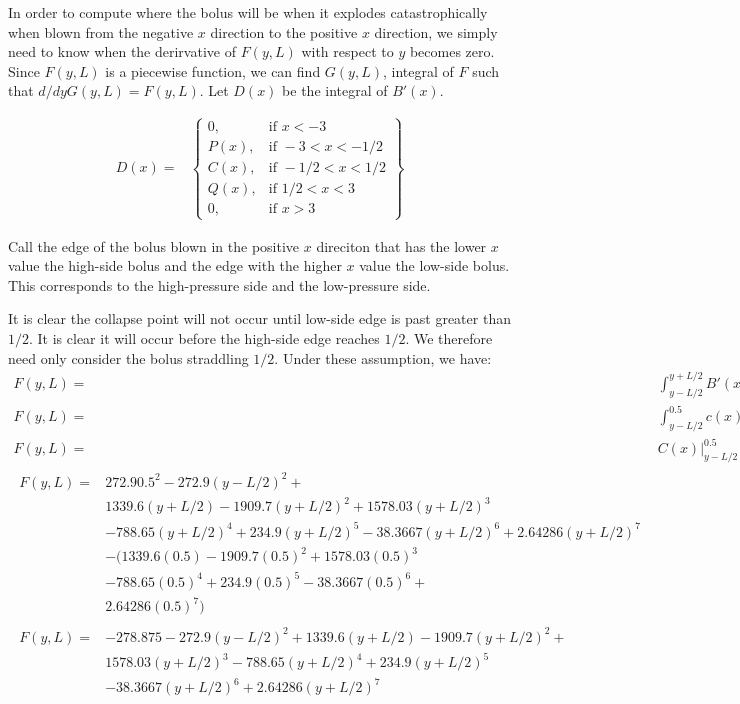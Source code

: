 \documentclass[]{asme2ej}
\begin{document}
In order to compute where the bolus will be when it explodes catastrophically when blown from
the negative $x$ direction to the positive $x$ direction, we simply need to know when the derirvative of
$F(y,L)$ with respect to $y$ becomes zero. Since $F(y,L)$ is a piecewise function, we can find $G(y,L)$,
integral of $F$ such that $d/dy G(y,L) = F(y,L)$. Let $D(x)$ be the integral of $B'(x)$.

\begin{align}
  D(x) =  &
\left\{
    \begin{array}{lr}
      0 , & \text{if } x < -3 \\
      P(x) , & \text{if } -3 < x  < -1/2 \\
      C(x) , & \text{if } -1/2 < x < 1/2 \\
      Q(x)   , & \text{if } 1/2 < x < 3 \\
      0 , & \text{if } x > 3
    \end{array}
    \right\}
    \label{eq:Dintegration}
\end{align}



Call the edge of the bolus blown in the positive $x$ direciton that has the lower $x$ value the high-side bolus and the edge with the higher $x$ value the low-side bolus.
This corresponds to the high-pressure side and the low-pressure side.

It is clear the collapse point will not occur until low-side edge is past greater than $1/2$. It is clear it will occur before the high-side edge reaches $1/2$. We therefore need only consider the bolus straddling
$1/2$.
Under these assumption, we have:
\begin{align}
  F(y,L) = & \int_{y-L/2}^{y+L/2} B'(x) dx \\
  F(y,L) = & \int_{y-L/2}^{0.5} c(x) dx  + \int_{0.5}^{y+L/2} q(x) dx   \\
  F(y,L) = & C(x) \bigg\rvert_{y-L/2}^{0.5}   +  Q(x) \bigg\rvert_{0.5}^{y+L/2} \\
  \begin{split}
  F(y,L) = & 272.9 0.5^2 - 272.9 (y-L/2)^2 + \\
  & 1339.6 (y+L/2) - 1909.7 (y+L/2)^2 + 1578.03 (y+L/2)^3 \\
  & - 788.65 (y+L/2)^4 + 234.9 (y+L/2)^5 - 38.3667 (y+L/2)^6 + 2.64286 (y+L/2)^7 \\
  & -(  1339.6 (0.5) - 1909.7 (0.5)^2 + 1578.03 (0.5)^3 \\
  & - 788.65 (0.5)^4 + 234.9 (0.5)^5 - 38.3667 (0.5)^6 + \\
  & 2.64286 (0.5)^7)
  \end{split} \\
  \begin{split}
  F(y,L) = & -278.875 - 272.9 (y-L/2)^2 + 1339.6 (y+L/2) - 1909.7 (y+L/2)^2 + \\
  & 1578.03 (y+L/2)^3 - 788.65 (y+L/2)^4 + 234.9 (y+L/2)^5 \\
  & - 38.3667 (y+L/2)^6 + 2.64286 (y+L/2)^7
  \end{split}
    \label{eq:force}
\end{align}
\end{document}
